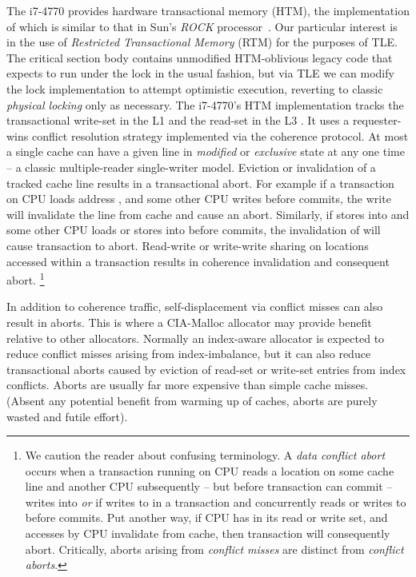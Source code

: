 \documentclass[preprint]{sigplanconf}
\begin{document}
The i7-4770 provides hardware transactional memory (HTM), the implementation
of which is similar to that in Sun's \emph{ROCK} processor~\cite{asplos09-dice}.
Our particular interest
is in the use of \emph{Restricted Transactional Memory} (RTM) for the purposes of
TLE.  The critical section body contains unmodified HTM-oblivious legacy code 
that expects to run under the lock in the usual fashion, but via TLE we can 
modify the lock implementation to attempt optimistic execution, reverting to classic
\emph{physical locking} only as necessary. The i7-4770's HTM implementation tracks the 
transactional write-set in the L1 and the read-set in the L3 . It uses a 
requester-wins conflict resolution strategy implemented via the coherence protocol. 
At most a single cache can have a given line in \emph{modified} or \emph{exclusive} 
state at any one time -- a classic multiple-reader single-writer model. Eviction 
or invalidation of a tracked cache line results in a transactional abort.  
For example if a transaction on CPU  loads address , and some other CPU writes 
 before  commits, the write will invalidate the line from  cache and cause 
an abort. Similarly, if  stores into  and some other CPU loads or stores 
into  before  commits, the invalidation of  will cause  transaction to 
abort. Read-write or write-write sharing on locations accessed within a 
transaction results in coherence invalidation and consequent abort. 
\footnote{We caution the reader about confusing terminology.  A \emph{data conflict
abort} occurs when a transaction running on CPU  reads a location on some cache 
line  and another CPU  subsequently -- but before  transaction
can commit -- writes into  \emph{or} if  writes to  in a transaction and  
concurrently reads or writes to  before  commits.  Put another way,
if CPU  has  in its read or write set, and accesses by CPU  invalidate
 from  cache, then  transaction will consequently abort.
Critically, aborts arising from \emph{conflict misses} are distinct 
from \emph{conflict aborts}.} 

In addition to coherence traffic, self-displacement via conflict misses can 
also result in aborts. This is where a CIA-Malloc allocator may provide benefit 
relative to other allocators. Normally an index-aware allocator is expected to 
reduce conflict misses arising from index-imbalance, but it can also reduce 
transactional aborts caused by eviction of read-set or write-set entries from 
index conflicts. Aborts are usually far more expensive than simple cache misses. 
(Absent any potential benefit from warming up of caches, aborts are purely wasted 
and futile effort).
\end{document}
